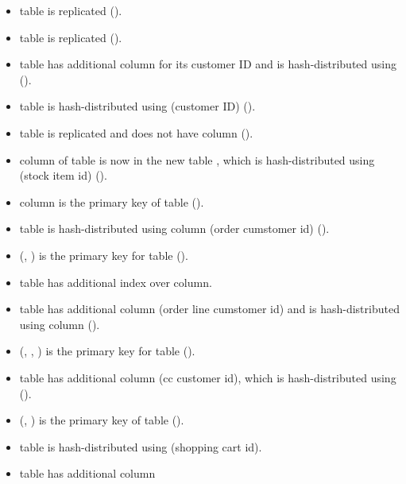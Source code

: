   \begin{itemize}		%
  	\item {} table is replicated ().
  	\item {} table is replicated ().
  	\item {} table has additional column  for its customer ID and
			is hash-distributed using  ().
  	\item {} table is hash-distributed using  (customer ID)
			().
  	\item {} table is replicated and does not have  column
			().
  	\item {} column of  table is now in the new table ,
			which is hash-distributed using  (stock item id) ().
  	\item {} column is the primary key of  table ().
  	\item {} table is hash-distributed using  column (order cumstomer id)
			().
  	\item (, ) is the primary key for  table
			().
  	\item {} table has additional index over  column.
  	\item {} table has additional column  (order line cumstomer id) and
			is hash-distributed using  column ().
  	\item (, , ) is the primary key for 
			table ().
  	\item {} table has additional column  (cc customer id), which is
			hash-distributed using  ().
  	\item (, ) is the primary key of  table
			().
  	\item {} table is hash-distributed using  (shopping cart id).
  	\item {} table has additional column 

\end{itemize}
